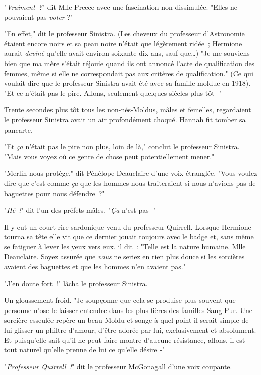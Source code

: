 "\emph{Vraiment~?}" dit Mlle Preece avec une fascination non dissimulée. "Elles ne pouvaient pas \emph{voter} ?"

"En effet," dit le professeur Sinistra. (Les cheveux du professeur d'Astronomie étaient encore noirs et sa peau noire n'était que légèrement ridée~; Hermione aurait \emph{deviné} qu'elle avait environ soixante-dix ans, sauf que…) "Je me souviens bien que ma mère s'était réjouie quand ils ont annoncé l'acte de qualification des femmes, même si elle ne correspondait pas aux critères de qualification." (Ce qui voulait dire que le professeur Sinistra avait été avec sa famille moldue en 1918). "Et ce n'était pas le pire. Allons, seulement quelques siècles plus tôt -"

Trente secondes plus tôt tous les non-nés-Moldus, mâles et femelles, regardaient le professeur Sinistra avait un air profondément choqué. Hannah fit tomber sa pancarte.

"Et \emph{ça} n'était pas le pire non plus, loin de là," conclut le professeur Sinistra. "Mais vous voyez où ce genre de chose peut potentiellement mener."

"Merlin nous protège," dit Pénélope Deauclaire d'une voix étranglée. "Vous voulez dire que c'est comme \emph{ça} que les hommes nous traiteraient si nous n'avions pas de baguettes pour nous défendre~?"

"\emph{Hé~!}" dit l'un des préfets mâles. "\emph{Ça} n'est pas -"

Il y eut un court rire sardonique venu du professeur Quirrell. Lorsque Hermione tourna sa tête elle vit que ce dernier jouait toujours avec le badge et, sans même se fatiguer à lever les yeux vers eux, il dit~: "Telle est la nature humaine, Mlle Deauclaire. Soyez assurée que \emph{vous} ne seriez en rien plus douce si les sorcières avaient des baguettes et que les hommes n'en avaient pas."

"J'en doute fort~!" lâcha le professeur Sinistra.

Un gloussement froid. "Je soupçonne que cela se produise plus souvent que personne n'ose le laisser entendre dans les plus fières des familles Sang Pur. Une sorcière esseulée repère un beau Moldu et songe à quel point il serait simple de lui glisser un philtre d'amour, d'être adorée par lui, exclusivement et absolument. Et puisqu'elle sait qu'il ne peut faire montre d'aucune résistance, allons, il est tout naturel qu'elle prenne de lui ce qu'elle désire -"

"\emph{Professeur Quirrell~!}" dit le professeur McGonagall d'une voix coupante.

